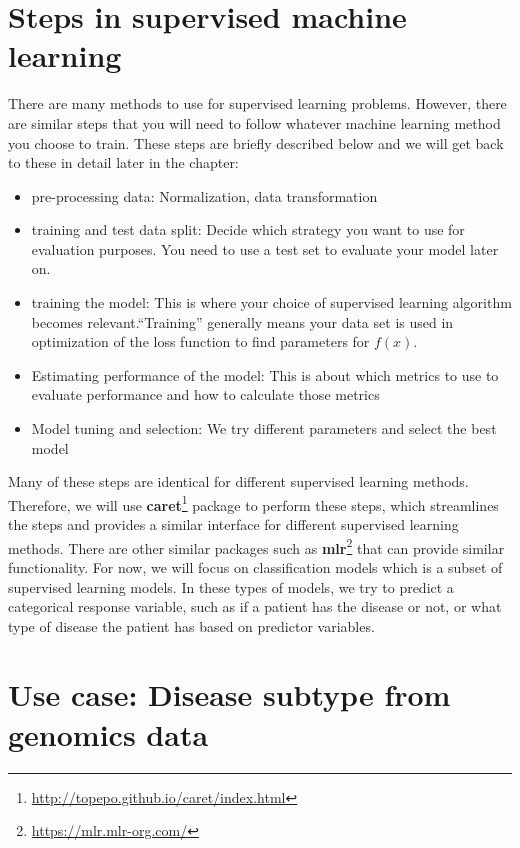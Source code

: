 \documentclass[12pt,]{krantz}
\providecommand{\tightlist}{%
  \setlength{\itemsep}{0pt}\setlength{\parskip}{0pt}}
\renewcommand{\href}[2]{#2\footnote{\url{#1}}}
\begin{document}
\hypertarget{steps-in-supervised-machine-learning}{%
\section{Steps in supervised machine learning}\label{steps-in-supervised-machine-learning}}

There are many methods to use for supervised learning problems. However, there are similar steps that you will need to follow whatever machine learning method you choose to train. These steps are briefly described below and we will get back to these in detail later in the chapter:

\begin{itemize}
\tightlist
\item
  pre-processing data: Normalization, data transformation
\item
  training and test data split: Decide which strategy you want to use for evaluation purposes. You need to use a test set to evaluate your model later on.
\item
  training the model: This is where your choice of supervised learning algorithm becomes relevant.``Training'' generally means your data set is used in optimization of the loss function to find parameters for \(f(x)\).
\item
  Estimating performance of the model: This is about which metrics to use to evaluate performance and how to calculate those metrics
\item
  Model tuning and selection: We try different parameters and select the best model
\end{itemize}

Many of these steps are identical for different supervised learning methods. Therefore, we will use \href{http://topepo.github.io/caret/index.html}{\textbf{caret}} package to perform these steps, which streamlines the steps and provides a similar interface for different supervised learning methods. There are other similar packages such as \href{https://mlr.mlr-org.com/}{\textbf{mlr}} that can provide similar functionality. For now, we will focus on classification models which is a subset of supervised learning models. In these types of models, we try to predict a categorical response variable, such as if a patient has the disease or not, or what type of disease the patient has based on predictor variables.

\hypertarget{use-case-disease-subtype-from-genomics-data}{%
\section{Use case: Disease subtype from genomics data}\label{use-case-disease-subtype-from-genomics-data}}
\end{document}
